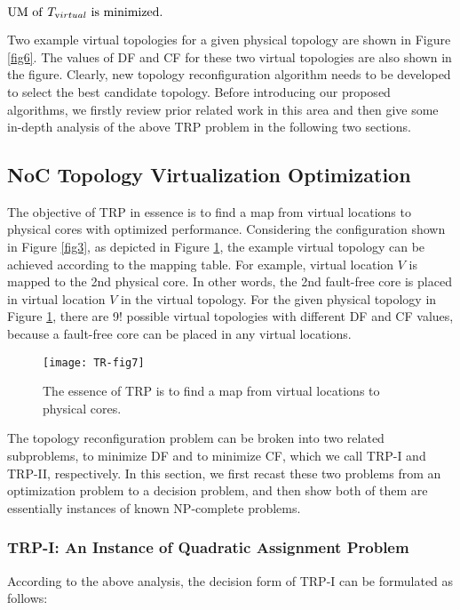      \begin{center}
         $\mathrm{UM\ of}\ T_{\text virtual}\ \mathrm{is\ minimized.} $ \\
     \end{center}

Two example virtual topologies for a given physical topology are shown in Figure \ref{fig6}. The values of DF and CF for these two virtual topologies are also shown in the figure. Clearly, new topology reconfiguration algorithm needs to be developed to select the best candidate topology. Before introducing our proposed algorithms, we firstly review prior related work in this area and then give some in-depth analysis of the above TRP problem in the following two sections.

\subsection{NoC Topology Virtualization Optimization}
The objective of TRP in essence is to find a map from virtual locations to physical cores with optimized performance. Considering the configuration shown in Figure \ref{fig3}, as depicted in Figure \ref{fig7}, the example virtual topology can be achieved according to the mapping table. For example, virtual location $V$ is mapped to the 2nd physical core. In other words, the 2nd fault-free core is placed in virtual location $V$ in the virtual topology. For the given physical topology in Figure \ref{fig7}, there are 9! possible virtual topologies with different DF and CF values, because a fault-free core can be placed in any virtual locations.

\begin{figure}[t]
    \centering
        \texttt{[image: TR-fig7]}
          \caption{ The essence of TRP is to find a map from virtual locations to physical cores.}
             \label{fig7}
\end{figure}

The topology reconfiguration problem can be broken into two related subproblems, to minimize DF and to minimize CF, which we call TRP-I and TRP-II, respectively. In this section, we first recast these two problems from an optimization problem to a decision problem, and then show both of them are essentially instances of known NP-complete problems.

\subsubsection{TRP-I: An Instance of Quadratic Assignment Problem}
According to the above analysis, the decision form of TRP-I can be formulated as follows:


